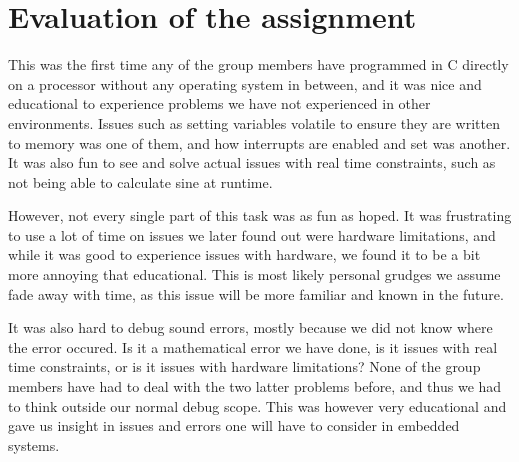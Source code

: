 \section{Evaluation of the assignment}

This was the first time any of the group members have programmed in C
directly on a processor without any operating system in between, and it
was nice and educational to experience problems we have not experienced
in other environments.  Issues such as setting variables volatile to
ensure they are written to memory was one of them, and how interrupts
are enabled and set was another. It was also fun to see and solve
actual issues with real time constraints, such as not being able to
calculate sine at runtime.

However, not every single part of this task was as fun as hoped. It was
frustrating to use a lot of time on issues we later found out were
hardware limitations, and while it was good to experience issues with
hardware, we found it to be a bit more annoying that educational.  This
is most likely personal grudges we assume fade away with time, as this
issue will be more familiar and known in the future.

It was also hard to debug sound errors, mostly because we did not know
where the error occured. Is it a mathematical error we have done, is it
issues with real time constraints, or is it issues with hardware
limitations? None of the group members have had to deal with the two
latter problems before, and thus we had to think outside our normal
debug scope. This was however very educational and gave us insight in
issues and errors one will have to consider in embedded systems.
